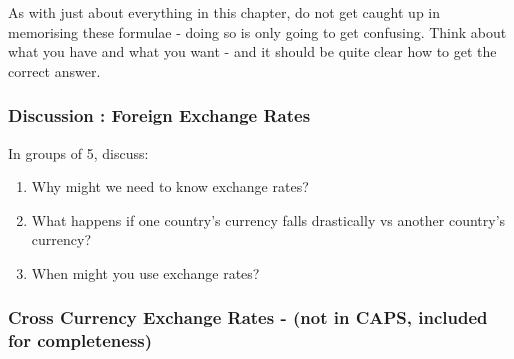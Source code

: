           \label{m39335*id67823}As with just about everything in this chapter, do not get caught up in memorising these formulae - doing so is only going to get confusing. Think about what you have and what you want - and it should be quite clear how to get the correct answer.\par 
\label{m39335*secfhsst!!!underscore!!!id536}
            \subsubsection{  Discussion : Foreign Exchange Rates }
            \nopagebreak
            
          \label{m39335*id67836}In groups of 5, discuss:\par 
          \label{m39335*id67841}\begin{enumerate}[noitemsep, label=\textbf{\arabic*}. ] 
            \label{m39335*uid8}\item Why might we need to know exchange rates?
\label{m39335*uid9}\item What happens if one country's currency falls drastically vs another country's currency?
\label{m39335*uid10}\item When might you use exchange rates?
\end{enumerate}
        
          

        
      
      \label{m39335*uid11}
            \subsubsection{ Cross Currency Exchange Rates - (not in CAPS, included for completeness)}
            \nopagebreak
            
